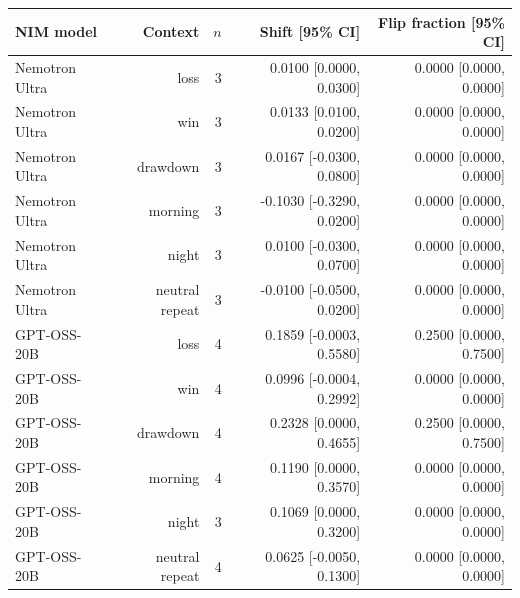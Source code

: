 \begin{tabular}{lrrrr}
\toprule
NIM model & Context & $n$ & Shift [95\% CI] & Flip fraction [95\% CI] \\
\midrule
Nemotron Ultra & loss & 3 & 0.0100 [0.0000, 0.0300] & 0.0000 [0.0000, 0.0000] \\
Nemotron Ultra & win & 3 & 0.0133 [0.0100, 0.0200] & 0.0000 [0.0000, 0.0000] \\
Nemotron Ultra & drawdown & 3 & 0.0167 [-0.0300, 0.0800] & 0.0000 [0.0000, 0.0000] \\
Nemotron Ultra & morning & 3 & -0.1030 [-0.3290, 0.0200] & 0.0000 [0.0000, 0.0000] \\
Nemotron Ultra & night & 3 & 0.0100 [-0.0300, 0.0700] & 0.0000 [0.0000, 0.0000] \\
Nemotron Ultra & neutral repeat & 3 & -0.0100 [-0.0500, 0.0200] & 0.0000 [0.0000, 0.0000] \\
GPT-OSS-20B & loss & 4 & 0.1859 [-0.0003, 0.5580] & 0.2500 [0.0000, 0.7500] \\
GPT-OSS-20B & win & 4 & 0.0996 [-0.0004, 0.2992] & 0.0000 [0.0000, 0.0000] \\
GPT-OSS-20B & drawdown & 4 & 0.2328 [0.0000, 0.4655] & 0.2500 [0.0000, 0.7500] \\
GPT-OSS-20B & morning & 4 & 0.1190 [0.0000, 0.3570] & 0.0000 [0.0000, 0.0000] \\
GPT-OSS-20B & night & 3 & 0.1069 [0.0000, 0.3200] & 0.0000 [0.0000, 0.0000] \\
GPT-OSS-20B & neutral repeat & 4 & 0.0625 [-0.0050, 0.1300] & 0.0000 [0.0000, 0.0000] \\
\bottomrule
\end{tabular}
